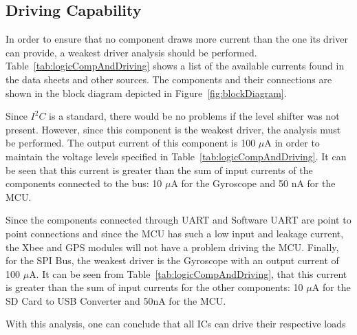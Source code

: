   \vspace{-2cm}

\subsection{Driving Capability}

In order to ensure that no component draws more current than the one its driver can provide, a weakest driver analysis should be performed. Table~\ref{tab:logicCompAndDriving} shows a list of the available currents found in the data sheets and other sources. The components and their connections are shown in the block diagram depicted in Figure~\ref{fig:blockDiagram}.

Since $I^2C$ is a standard, there would be no problems if the level shifter was not present.  However, since this component is the weakest driver, the analysis must be performed.  The output current of this component is 100 $\mu$A in order to maintain the voltage levels specified in Table~\ref{tab:logicCompAndDriving}.  It can be seen that this current is greater than the sum of input currents of the components connected to the bus: 10 $\mu$A for the Gyroscope and 50 nA for the MCU.

Since the components connected through UART and Software UART are point to point connections and since the MCU has such a low input and leakage current, the Xbee and GPS modules will not have a problem driving the MCU.  Finally, for the SPI Bus, the weakest driver is the Gyroscope with an output current of 100 $\mu$A.  It can be seen from Table~\ref{tab:logicCompAndDriving}, that this current is greater than the sum of input currents for the other components: 10 $\mu$A for the SD Card to USB Converter and 50nA for the MCU.

With this analysis, one can conclude that all ICs can drive their respective loads

